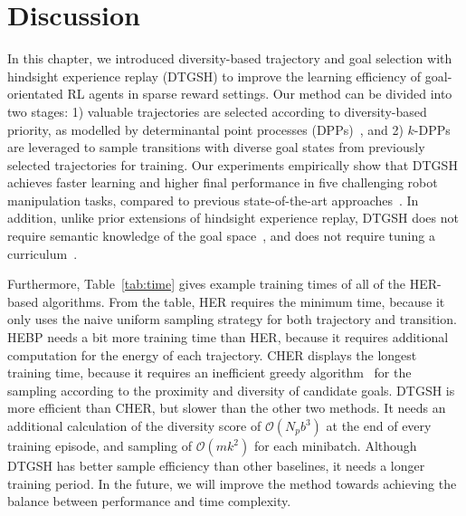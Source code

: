 \section{Discussion}
In this chapter, we introduced diversity-based trajectory and goal selection with hindsight experience replay (DTGSH) to improve the learning efficiency of goal-orientated RL agents in sparse reward settings. Our method can be divided into two stages: 1) valuable trajectories are selected according to diversity-based priority, as modelled by determinantal point processes (DPPs)~\cite{kulesza2012determinantal}, and 2) $k$-DPPs~\cite{kulesza2011k} are leveraged to sample transitions with diverse goal states from previously selected trajectories for training. Our experiments empirically show that DTGSH achieves faster learning and higher final performance in five challenging robot manipulation tasks, compared to previous state-of-the-art approaches~\cite{andrychowicz2017hindsight,fang2019curriculum,zhao2018energy}. In addition, unlike prior extensions of hindsight experience replay, DTGSH does not require semantic knowledge of the goal space~\cite{zhao2018energy}, and does not require tuning a curriculum~\cite{fang2019curriculum}.

\begin{table}[h!]
    \centering
    \vspace{0.2em}
    \caption[Training time comparison between DTGSH and other baselines.]{Training time (hours:minutes:seconds) of DTGSH and baseline approaches on the Push task for 50 epochs.}
    \label{tab:time}
\end{table}

Furthermore, Table~\ref{tab:time} gives example training times of all of the HER-based algorithms. From the table, HER requires the minimum time, because it only uses the naive uniform sampling strategy for both trajectory and transition. HEBP needs a bit more training time than HER, because it requires additional computation for the energy of each trajectory. CHER displays the longest training time, because it requires an inefficient greedy algorithm~\cite{fang2019curriculum} for the sampling according to the proximity and diversity of candidate goals. DTGSH is more efficient than CHER, but slower than the other two methods. It needs an additional calculation of the diversity score of $\mathcal{O}(N_{p}b^3)$ at the end of every training episode, and sampling of $\mathcal{O}(mk^2)$ for each minibatch. Although DTGSH has better sample efficiency than other baselines, it needs a longer training period. In the future, we will improve the method towards achieving the balance between performance and time complexity.

